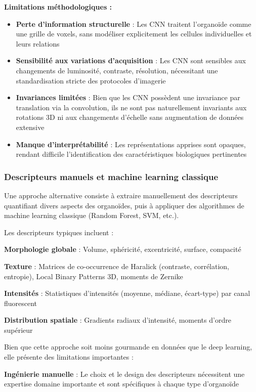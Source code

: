 \textbf{Limitations méthodologiques :}
\begin{itemize}
    \item \textbf{Perte d'information structurelle} : Les CNN traitent l'organoïde comme une grille de voxels, sans modéliser explicitement les cellules individuelles et leurs relations
    \item \textbf{Sensibilité aux variations d'acquisition} : Les CNN sont sensibles aux changements de luminosité, contraste, résolution, nécessitant une standardisation stricte des protocoles d'imagerie
    \item \textbf{Invariances limitées} : Bien que les CNN possèdent une invariance par translation via la convolution, ils ne sont pas naturellement invariants aux rotations 3D ni aux changements d'échelle sans augmentation de données extensive
    \item \textbf{Manque d'interprétabilité} : Les représentations apprises sont opaques, rendant difficile l'identification des caractéristiques biologiques pertinentes
\end{itemize}

\subsubsection{Descripteurs manuels et machine learning classique}

Une approche alternative consiste à extraire manuellement des descripteurs quantifiant divers aspects des organoïdes, puis à appliquer des algorithmes de machine learning classique (Random Forest, SVM, etc.).

Les descripteurs typiques incluent :

\textbf{Morphologie globale} : Volume, sphéricité, excentricité, surface, compacité

\textbf{Texture} : Matrices de co-occurrence de Haralick (contraste, corrélation, entropie), Local Binary Patterns 3D, moments de Zernike

\textbf{Intensités} : Statistiques d'intensités (moyenne, médiane, écart-type) par canal fluorescent

\textbf{Distribution spatiale} : Gradients radiaux d'intensité, moments d'ordre supérieur

Bien que cette approche soit moins gourmande en données que le deep learning, elle présente des limitations importantes :

\textbf{Ingénierie manuelle} : Le choix et le design des descripteurs nécessitent une expertise domaine importante et sont spécifiques à chaque type d'organoïde

